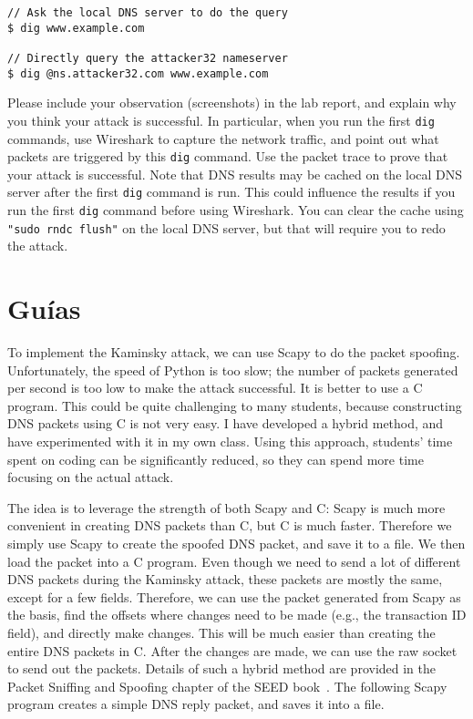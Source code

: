 \begin{lstlisting}
// Ask the local DNS server to do the query
$ dig www.example.com

// Directly query the attacker32 nameserver
$ dig @ns.attacker32.com www.example.com
\end{lstlisting}
 
Please include your observation (screenshots) in the lab 
report, and explain why you think your attack is successful. 
In particular, when you run the first \texttt{dig} commands,
use Wireshark to capture the network traffic, and 
point out what packets are triggered by this
\texttt{dig} command. Use the packet trace to 
prove that your attack is successful. Note that DNS results
may be cached on the local DNS server after the first
\texttt{dig} command is run. This could influence the
results if you run the first \texttt{dig} command before using
Wireshark. You can clear the cache using \texttt{"sudo rndc flush"} 
on the local DNS server, but that will 
require you to redo the attack.



\section{Guías} 

To implement the Kaminsky attack, we can use Scapy to do the packet spoofing. Unfortunately,
the speed of Python is too slow; the number of packets generated per second is too low to
make the attack successful. It is better to use a C program. This could
be quite challenging to many students, because constructing DNS packets using C is not very
easy. I have developed a hybrid method, and have experimented with it in my own class. Using
this approach, students' time spent on coding can be significantly reduced, so they can spend
more time focusing on the actual attack.


The idea is to leverage the strength of both Scapy and C: Scapy is much more convenient in
creating DNS packets than C, but C is much faster. Therefore we simply
use Scapy to create the spoofed DNS packet, and save it to a file.
We then load the packet into a C program. Even though we need to send a 
lot of different DNS packets
during the Kaminsky attack, these packets are mostly the same, except for a few fields. 
Therefore, we can
use the packet generated from Scapy as the basis, find the offsets where
changes need to be made (e.g., the transaction ID field),
and directly make changes. This will be much easier than
creating the entire DNS packets in C.
After the changes are made, we can use the raw socket to send out the packets.
Details of such a hybrid method are provided in
the Packet Sniffing and Spoofing chapter 
of the SEED book~\cite{seedbook}.
The following Scapy program creates a simple DNS reply packet, 
and saves it into a file.


